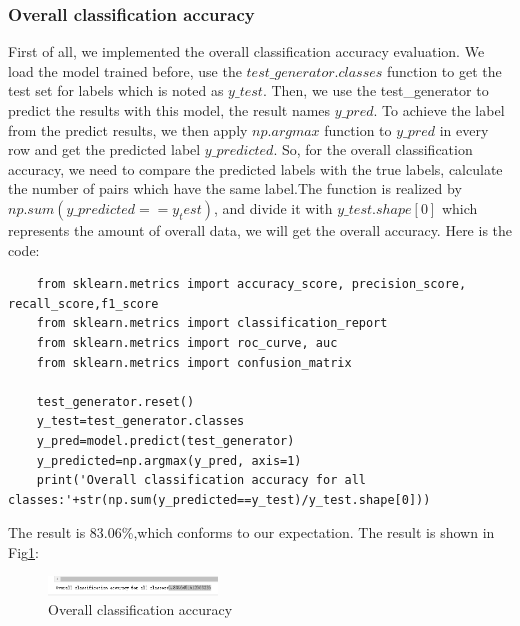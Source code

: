 \documentclass[conference]{IEEEtran}
\begin{document}
\subsubsection{Overall classification accuracy}
First of all, we implemented the overall classification accuracy evaluation. We load the model trained before, use the $test\_generator.classes$ function to get the test set for labels which is noted as $y\_test$.
Then, we use the test\_generator to predict the results with this model, the result names $y\_pred$. To achieve the label from the predict results, we then apply $np.argmax$ function to $y\_pred$ in every row and get the predicted label $y\_predicted$. 
So, for the overall classification accuracy, we need to compare the predicted labels with the true labels, calculate the number of pairs which have the same label.The function is realized by $np.sum(y\_predicted==y_test)$, and divide it with $y\_test.shape[0]$ which represents the amount of overall data, we will get the overall accuracy.
Here is the code:
\begin{lstlisting}
    from sklearn.metrics import accuracy_score, precision_score, recall_score,f1_score
    from sklearn.metrics import classification_report
    from sklearn.metrics import roc_curve, auc
    from sklearn.metrics import confusion_matrix

    test_generator.reset()
    y_test=test_generator.classes
    y_pred=model.predict(test_generator)
    y_predicted=np.argmax(y_pred, axis=1)
    print('Overall classification accuracy for all classes:'+str(np.sum(y_predicted==y_test)/y_test.shape[0]))
\end{lstlisting}
The result is 83.06\%,which conforms to our expectation. The result is shown in Fig\ref{Fig.t3q1}:
\begin{figure}[h] 
    \centering
    \includegraphics[width=0.4\textwidth]{T3Q1a.png}
    \caption{Overall classification accuracy}
    \label{Fig.t3q1}
\end{figure}
\end{document}

